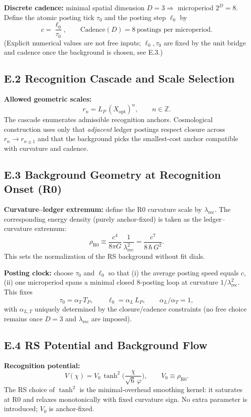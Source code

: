 \documentclass[11pt]{article}
\theoremstyle{definition}
\theoremstyle{remark}
\begin{document}
\noindent
\textbf{Discrete cadence:} minimal spatial dimension \(D=3\Rightarrow\) microperiod \(2^D=8\). Define the atomic posting tick \(\tau_0\) and the posting step \(\ell_0\) by
\[
c=\frac{\ell_0}{\tau_0},\qquad \text{Cadence}(D)=8\ \text{postings per microperiod}.
\]
(Explicit numerical values are not free inputs; \(\ell_0,\tau_0\) are fixed by the unit bridge and cadence once the background is chosen, see E.3.)

\subsection*{E.2 Recognition Cascade and Scale Selection}

\noindent
\textbf{Allowed geometric scales:}
\[
r_n=L_P\,(X_{\mathrm{opt}})^n,\qquad n\in\mathbb{Z}.
\]
The cascade enumerates admissible recognition anchors. Cosmological construction uses only that \emph{adjacent} ledger postings respect closure across \(r_n\to r_{n\pm1}\) and that the background picks the smallest-cost anchor compatible with curvature and cadence.

\subsection*{E.3 Background Geometry at Recognition Onset (R0)}

\noindent
\textbf{Curvature–ledger extremum:} define the R0 curvature scale by \(\lambda_{\mathrm{rec}}\). The corresponding energy density (purely anchor-fixed) is taken as the ledger–curvature extremum:
\[
\rho_{\mathrm{R0}} \equiv \frac{c^4}{8\pi G}\,\frac{1}{\lambda_{\mathrm{rec}}^2}
= \frac{c^7}{8\,\hbar\,G^2}.
\]
This sets the normalization of the RS background without fit dials.

\noindent
\textbf{Posting clock:} choose \(\tau_0\) and \(\ell_0\) so that (i) the average posting speed equals \(c\), (ii) one microperiod spans a minimal closed 8-posting loop at curvature \(1/\lambda_{\mathrm{rec}}^2\). This fixes
\[
\tau_0=\alpha_T\,T_P,\qquad \ell_0=\alpha_L\,L_P,\qquad \alpha_L/\alpha_T=1,
\]
with \(\alpha_{L,T}\) uniquely determined by the closure/cadence constraints (no free choice remains once \(D=3\) and \(\lambda_{\mathrm{rec}}\) are imposed).

\subsection*{E.4 RS Potential and Background Flow}

\noindent
\textbf{Recognition potential:}
\[
V(\chi)=V_0\,\tanh^2\!\Big(\frac{\chi}{\sqrt{6}\,\varphi}\Big),\qquad V_0\equiv \rho_{\mathrm{R0}}.
\]
The RS choice of \(\tanh^2\) is the minimal-overhead smoothing kernel: it saturates at R0 and relaxes monotonically with fixed curvature sign. No extra parameter is introduced; \(V_0\) is anchor-fixed.
\end{document}
